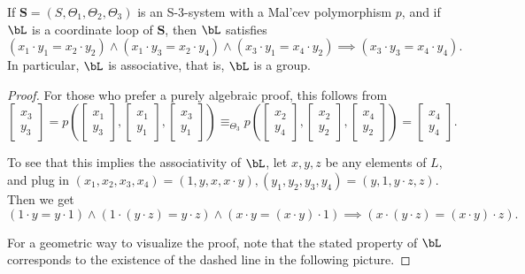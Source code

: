 \begin{lem}\label{S3-loop-associative} If $\mathbf{S} = (S,\Theta_1,\Theta_2,\Theta_3)$ is an S-3-system with a Mal'cev polymorphism $p$, and if $\bL$ is a coordinate loop of $\mathbf{S}$, then $\bL$ satisfies
\[
(x_1\cdot y_1 = x_2\cdot y_2) \wedge (x_1\cdot y_3 = x_2\cdot y_4) \wedge (x_3\cdot y_1 = x_4\cdot y_2) \implies (x_3\cdot y_3 = x_4 \cdot y_4).
\]
In particular, $\bL$ is associative, that is, $\bL$ is a group.
\end{lem}
\begin{proof} For those who prefer a purely algebraic proof, this follows from
\[
\begin{bmatrix} x_3\\ y_3\end{bmatrix} = p\left(\begin{bmatrix} x_1\\ y_3\end{bmatrix}, \begin{bmatrix} x_1\\ y_1\end{bmatrix}, \begin{bmatrix} x_3\\ y_1\end{bmatrix}\right) \equiv_{\Theta_3} p\left(\begin{bmatrix} x_2\\ y_4\end{bmatrix}, \begin{bmatrix} x_2\\ y_2\end{bmatrix}, \begin{bmatrix} x_4\\ y_2\end{bmatrix}\right) = \begin{bmatrix} x_4\\ y_4\end{bmatrix}.
\]

To see that this implies the associativity of $\bL$, let $x,y,z$ be any elements of $L$, and plug in $(x_1,x_2,x_3,x_4) = (1, y, x, x\cdot y), (y_1,y_2,y_3,y_4) = (y, 1, y\cdot z, z)$. Then we get
\[
(1\cdot y = y\cdot 1) \wedge (1\cdot (y\cdot z) = y\cdot z) \wedge (x\cdot y = (x\cdot y)\cdot 1) \implies (x\cdot (y\cdot z) = (x\cdot y) \cdot z).
\]

For a geometric way to visualize the proof, note that the stated property of $\bL$ corresponds to the existence of the dashed line in the following picture.


\end{proof}

